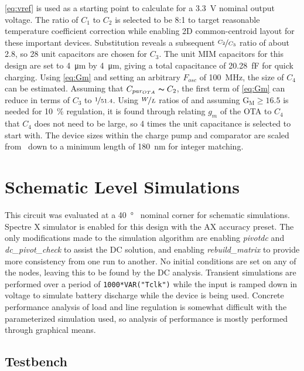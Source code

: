 \documentclass[11pt,letterpaper]{article}
\begin{document}
\cref{eq:vref} is used as a starting point to calculate for a \qty{3.3}{\V} nominal output voltage. The ratio of \(C_1\) to \(C_2\) is selected to be 8:1 to target reasonable temperature coefficient correction while enabling 2D common-centroid layout for these important devices. Substitution reveals a subsequent \(\nicefrac{C_2}{C_3}\) ratio of about 2.8, so 28 unit capacitors are chosen for \(C_3\). The unit MIM capacitors for this design are set to \qty{4}{\um} by \qty{4}{\um}, giving a total capacitance of \qty{20.28}{fF} for quick charging. Using \cref{eq:Gm} and setting an arbitrary \(F_{osc}\) of \qty{100}{\mega\Hz}, the size of \(C_4\) can be estimated. Assuming that \(C_{par_{OTA}} \thicksim C_2\), the first term of \cref{eq:Gm} can reduce in terms of \(C_3\) to \(\nicefrac{1}{51.4}\). Using \(\nicefrac{W}{L}\) ratios of  and assuming \(\mathrm{G_M} \geq 16.5\) is needed for \qty{10}{\%} regulation, it is found through relating \(g_m\) of the OTA to \(C_4\) that \(C_4\) does not need to be large, so 4 times the unit capacitance is selected to start with. The device sizes within the charge pump and comparator are scaled from~\cite{Gregiore2006} down to a minimum length of \qty{180}{\nm} for integer matching. 

\section{Schematic Level Simulations}

This circuit was evaluated at a \qty{40}{\degree\C} nominal corner for schematic simulations. Spectre X simulator is enabled for this design with the AX accuracy preset. The only modifications made to the simulation algorithm are enabling \emph{pivotdc} and \emph{dc\_pivot\_check} to assist the DC solution, and enabling \emph{rebuild\_matrix} to provide more consistency from one run to another. No initial conditions are set on any of the nodes, leaving this to be found by the DC analysis. Transient simulations are performed over a period of \texttt{1000*VAR("Tclk")} while the input is ramped down in voltage to simulate battery discharge while the device is being used. Concrete performance analysis of load and line regulation is somewhat difficult with the parameterized simulation used, so analysis of performance is mostly performed through graphical means.

\subsection{Testbench}
\end{document}
